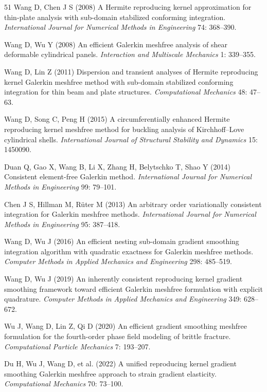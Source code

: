 \begin{thebibliography}{51}
 Wang D, Chen J S (2008) A {Hermite} reproducing kernel approximation for thin-plate analysis with sub-domain stabilized conforming integration. \emph{International Journal for Numerical Methods in Engineering} 74: 368--390.

 Wang D, Wu Y (2008) An efficient {Galerkin} meshfree analysis of shear deformable cylindrical panels. \emph{Interaction and Multiscale Mechanics} 1: 339--355.

 Wang D, Lin Z (2011) Dispersion and transient analyses of {Hermite} reproducing kernel {Galerkin} meshfree method with sub-domain stabilized conforming integration for thin beam and plate structures. \emph{Computational Mechanics} 48: 47--63.

 Wang D, Song C, Peng H (2015) A circumferentially enhanced {Hermite} reproducing kernel meshfree method for buckling analysis of {Kirchhoff--Love} cylindrical shells. \emph{International Journal of Structural Stability and Dynamics} 15: 1450090.

 Duan Q, Gao X, Wang B, Li X, Zhang H, Belytschko T, Shao Y (2014) Consistent element-free {Galerkin} method. \emph{International Journal for Numerical Methods in Engineering} 99: 79--101.

 Chen J S, Hillman M, R{\"u}ter M (2013) An arbitrary order variationally consistent integration for {Galerkin} meshfree methods. \emph{International Journal for Numerical Methods in Engineering} 95: 387--418.

 Wang D, Wu J (2016) An efficient nesting sub-domain gradient smoothing integration algorithm with quadratic exactness for {Galerkin} meshfree methods. \emph{Computer Methods in Applied Mechanics and Engineering} 298: 485--519.

 Wang D, Wu J (2019) An inherently consistent reproducing kernel gradient smoothing framework toward efficient {Galerkin} meshfree formulation with explicit quadrature. \emph{Computer Methods in Applied Mechanics and Engineering} 349: 628--672.

 Wu J, Wang D, Lin Z, Qi D (2020) An efficient gradient smoothing meshfree formulation for the fourth-order phase field modeling of brittle fracture. \emph{Computational Particle Mechanics} 7: 193--207.

 Du H, Wu J, Wang D, et al. (2022) A unified reproducing kernel gradient smoothing {Galerkin} meshfree approach to strain gradient elasticity. \emph{Computational Mechanics} 70: 73--100.


\end{thebibliography}
